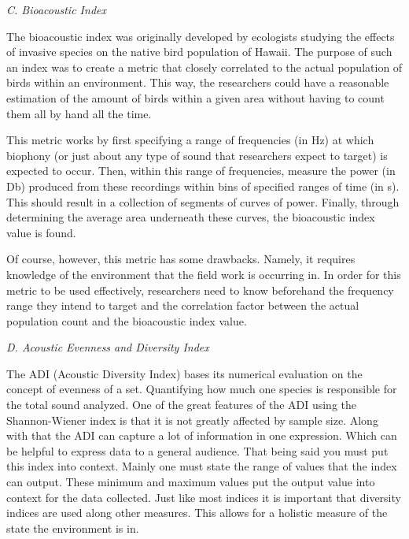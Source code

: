 \begin{flushleft}
\noindent\textit{C. Bioacoustic Index}\par
The bioacoustic index was originally developed by ecologists studying the effects of invasive species on the native bird population of Hawaii.\cite{boelman} The purpose of such an index was to create a metric that closely correlated to the actual population of birds within an environment. This way, the researchers could have a reasonable estimation of the amount of birds within a given area without having to count them all by hand all the time.\par
This metric works by first specifying a range of frequencies (in Hz) at which biophony (or just about any type of sound that researchers expect to target) is expected to occur. Then, within this range of frequencies, measure the power (in Db) produced from these recordings within bins of specified ranges of time (in s). This should result in a collection of segments of curves of power. Finally, through determining the average area underneath these curves, the bioacoustic index value is found.\par
Of course, however, this metric has some drawbacks. Namely, it requires knowledge of the environment that the field work is occurring in. In order for this metric to be used effectively, researchers need to know beforehand the frequency range they intend to target and the correlation factor between the actual population count and the bioacoustic index value.\par

\noindent\textit{D. Acoustic Evenness and Diversity Index}\par
The ADI (Acoustic Diversity Index) bases its numerical evaluation on the concept of evenness of a set. Quantifying how much one species is responsible for the total sound analyzed. One of the great features of the ADI using the Shannon-Wiener index is that it is not greatly affected by sample size. Along with that the ADI can capture a lot of information in one expression. Which can be helpful to express data to a general audience. That being said you must put this index into context. Mainly one must state the range of values that the index can output. These minimum and maximum values put the output value into context for the data collected. Just like most indices it is important that diversity indices are used along other measures. This allows for a holistic measure of the state the environment is in.\cite{shannonWiener}\par

\end{flushleft}
